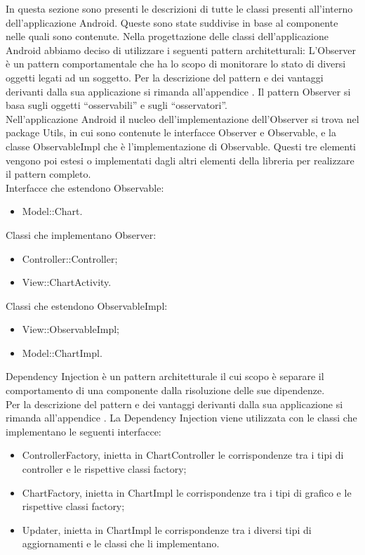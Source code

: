 		In questa sezione sono presenti le descrizioni di tutte le classi presenti all'interno dell'applicazione Android. Queste sono state suddivise in base al componente nelle quali sono contenute.
Nella progettazione delle classi dell'applicazione Android abbiamo deciso di utilizzare i seguenti pattern architetturali:
	L'Observer è un pattern comportamentale che ha lo scopo di monitorare lo stato di diversi oggetti legati ad un soggetto.
	Per la descrizione del pattern e dei vantaggi derivanti dalla sua applicazione si rimanda all'appendice .
	Il pattern Observer si basa sugli oggetti “osservabili” e sugli “osservatori”. \\ Nell'applicazione Android il nucleo dell'implementazione dell'Observer si trova nel package Utils, in cui sono contenute le interfacce Observer e Observable, e la classe ObservableImpl che è l'implementazione di Observable. Questi tre elementi vengono poi estesi o implementati dagli altri elementi della libreria per realizzare il pattern completo.\\
	Interfacce che estendono Observable:
	\begin{itemize}
	\item Model::Chart.
	\end{itemize}
	Classi che implementano Observer:
	\begin{itemize}
	\item Controller::Controller;
	\item View::ChartActivity.
	\end{itemize}
	Classi che estendono ObservableImpl:
	\begin{itemize}
	\item View::ObservableImpl;
	\item Model::ChartImpl.
	\end{itemize}
	Dependency Injection è un pattern architetturale il cui scopo è separare il comportamento di una componente dalla risoluzione delle sue dipendenze.\\
	Per la descrizione del pattern e dei vantaggi derivanti dalla sua applicazione si rimanda all'appendice .
	La Dependency Injection viene utilizzata con le classi che implementano le seguenti interfacce:
	\begin{itemize}
	\item ControllerFactory, inietta in ChartController le corrispondenze tra i tipi di controller e le rispettive classi factory;
	\item ChartFactory, inietta in ChartImpl le  corrispondenze tra i tipi di grafico e le rispettive classi factory;
	\item Updater, inietta in ChartImpl le corrispondenze tra i diversi tipi di aggiornamenti e le classi che li implementano.
	\end{itemize}
